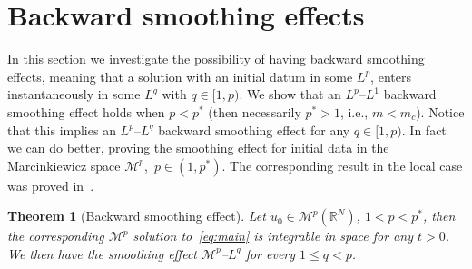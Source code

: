\documentclass[leqno,12pt]{amsart}
\newtheorem{theorem}{Theorem}[section]
\theoremstyle{definition}
\theoremstyle{remark}
\numberwithin{equation}{section}
\begin{document}
\section{Backward smoothing effects}\label{sec:positives results}

In this section we investigate the possibility of having backward smoothing effects, meaning that a solution with an initial datum in some $L^p$, enters instantaneously in some $L^q$ with $q\in[1,p)$. We  show that an $L^p$--$L^1$ backward smoothing effect holds when $p<p^*$ (then necessarily $p^*>1$, i.e., $m<m_c$). Notice that this implies an $L^p$--$L^q$ backward smoothing effect for any $q\in[1,p)$. In fact we can do better, proving the smoothing effect for initial data in the Marcinkiewicz space $\mathcal{M}^p$,~$p\in(1,p^*)$. The corresponding result in the local case was proved in~\cite[Theorem~5.15]{smoothbook}.  

\begin{theorem}[Backward smoothing effect]\label{backthm}
   Let $u_0\in\mathcal{M}^p(\mathbb{R}^N)$, $1<p<p^*$, then the corresponding $\mathcal{M}^p$ solution to~\eqref{eq:main} is integrable in space for any $t>0$. We then have the smoothing effect  $\mathcal{M}^p$--$L^q$ for every $1\le q<p$.
\end{theorem}
\end{document}
